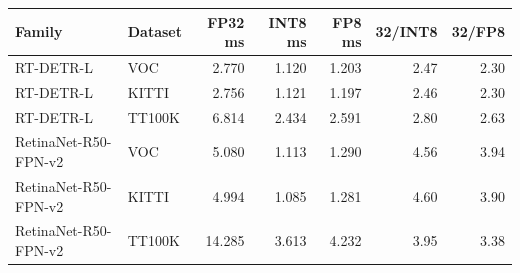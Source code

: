 \begin{tabular}{llrrrrr}
\toprule
Family & Dataset & FP32 ms & INT8 ms & FP8 ms & 32/INT8 & 32/FP8 \\
\midrule
RT-DETR-L & VOC & 2.770 & 1.120 & 1.203 & 2.47 & 2.30 \\
RT-DETR-L & KITTI & 2.756 & 1.121 & 1.197 & 2.46 & 2.30 \\
RT-DETR-L & TT100K & 6.814 & 2.434 & 2.591 & 2.80 & 2.63 \\
RetinaNet-R50-FPN-v2 & VOC & 5.080 & 1.113 & 1.290 & 4.56 & 3.94 \\
RetinaNet-R50-FPN-v2 & KITTI & 4.994 & 1.085 & 1.281 & 4.60 & 3.90 \\
RetinaNet-R50-FPN-v2 & TT100K & 14.285 & 3.613 & 4.232 & 3.95 & 3.38 \\
\bottomrule
\end{tabular}
